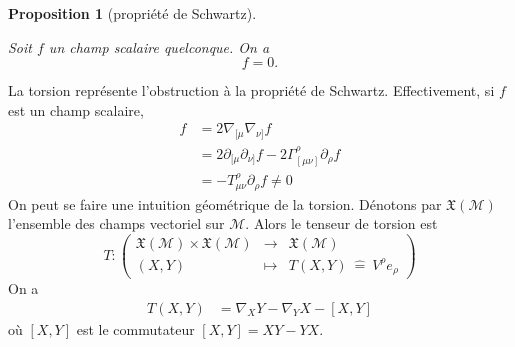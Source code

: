 \documentclass[a4paper,11pt]{report}
\theoremstyle{definition}
\theoremstyle{plain}
\newtheorem{prop}[thm]{Proposition}
\theoremstyle{definition}
\theoremstyle{remark}
\newcommand{\M}{\mathscr{M}}
\newcommand{\p}{\partial}
\begin{document}
                \begin{prop}[propriété de Schwartz]\begin{leftbar}
                    Soit $f$ un champ scalaire quelconque. On a
                    \begin{equation}
                        [\p_\mu,\p_\nu]f = 0.
                    \end{equation}
                \end{leftbar}\end{prop}
                
                La torsion représente l'obstruction à la propriété de Schwartz. Effectivement, si $f$ est un champ scalaire,
                \begin{align}
                    [\nabla_\mu,\nabla_\nu]f &= 2\nabla_{[\mu}\nabla_{\nu]}f\\
                    &= 2\p_{[\mu}\p_{\nu]}f-2\Gamma^\rho_{[\mu\nu]}\p_\rho f\\
                    &= -T^\rho_{\mu\nu}\p_\rho f\neq 0
                \end{align}
                On peut se faire une intuition géométrique de la torsion. Dénotons par $\mathfrak{X}(\M)$ l'ensemble des champs vectoriel sur $\M$. Alors le tenseur de torsion est
                \begin{equation}
                T:\left(
                \begin{array}{ccc}
                    \mathfrak{X}(\M)\times \mathfrak{X}(\M) & \longrightarrow & \mathfrak{X}(\M)\\
                    (X,Y) & \longmapsto & T(X,Y)~\hat{=}~V^\rho e_\rho
                \end{array}
                \right)
                \end{equation}
                On a 
                \begin{align}
                    T(X,Y) &= \nabla_X Y - \nabla_Y X - [X,Y]
                \end{align}
                où $[X,Y]$ est le commutateur $[X,Y] = XY-YX$.\\
                
\end{document}

